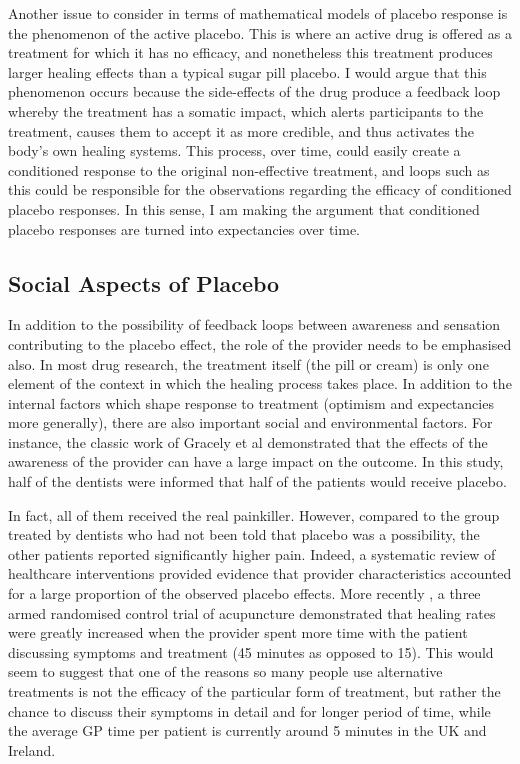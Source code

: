 Another issue to consider in terms of mathematical models of placebo response is the phenomenon of the active placebo. This is where an active drug is offered as a treatment for which it has no efficacy, and nonetheless this treatment produces larger healing effects than a typical sugar pill placebo. I would argue that this phenomenon occurs because the side-effects of the drug produce  a feedback loop whereby the treatment has a somatic impact, which alerts participants to the treatment, causes them to accept it as more credible, and thus activates the body's own healing systems. This process, over time, could easily create a conditioned response to the original non-effective treatment, and loops such as this could be responsible for the observations regarding the efficacy of conditioned placebo responses. In this sense, I am making the argument that conditioned placebo responses are turned into expectancies over time.   


\subsection{Social Aspects of Placebo}

In addition to the possibility of feedback loops between awareness and sensation contributing to the placebo effect, the role of the provider needs to be emphasised also. In most drug research, the treatment itself (the pill or cream) is only one element of the context in which the healing process takes place. In addition to the internal factors which shape response to treatment (optimism and expectancies more generally), there are also important social and environmental factors. For instance, the classic work of Gracely et al \cite{Gracely1985} demonstrated that the effects of the awareness of the provider can have a large impact on the outcome. In this study, half of the dentists were informed that half of the patients would receive placebo. 

In fact, all of them received the real painkiller. However, compared to the group treated by dentists who had not been told that placebo was a possibility, the other patients reported significantly higher pain. Indeed, a systematic review of healthcare interventions \cite{DiBlasi2001} provided evidence that provider characteristics accounted for a large proportion of the observed placebo effects. More recently \cite{Kaptchuk2008}, a three armed randomised control trial of acupuncture demonstrated that healing rates were greatly increased when the provider spent more time with the patient discussing symptoms and treatment (45 minutes as opposed to 15). This would seem to suggest that one of the reasons so many people use alternative treatments is not the efficacy of the particular form of treatment, but rather the chance to discuss their symptoms in detail and for longer period of time, while the average GP time per patient is currently around 5 minutes in the UK and Ireland. 

